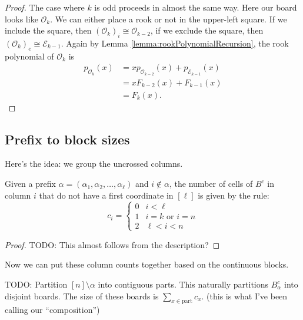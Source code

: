 \begin{proof}
  The case where $k$ is odd proceeds in almost the same way.
  Here our board looks like $\mathcal{O}_{k}$.
  We can either place a rook or not in the upper-left square.
  If we include the square, then $(\mathcal{O}_{k})_i \cong \mathcal{O}_{k-2}$,
  if we exclude the square, then $(\mathcal{O}_{k})_e \cong \mathcal{E}_{k-1}$.
  Again by Lemma \ref{lemma:rookPolynomialRecursion}, the rook polynomial
  of $\mathcal{O}_{k}$ is
  \begin{align}
    p_{\mathcal{O}_{k}}(x)
    &= xp_{\mathcal{O}_{k-2}}(x) + p_{\mathcal{E}_{k-1}}(x) \\
    &= xF_{k-2}(x) + F_{k-1}(x) \\
    &= F_{k}(x).
  \end{align}
\end{proof}

\subsection{Prefix to block sizes}
Here's the idea: we group the uncrossed columns.

\begin{lemma}
  Given a prefix $\alpha = (\alpha_1, \alpha_2, \dots, \alpha_\ell)$
  and $i \not\in \alpha$,
  the number of cells of $B^c$ in column $i$ that do not have
  a first coordinate in $[\ell]$
  is given by the rule:
  \begin{equation}
    c_i = \begin{cases}
      0 & i < \ell \\
      1 & i = k \text{ or } i = n \\
      2 & \ell < i < n
    \end{cases}
  \end{equation}
\end{lemma}

\begin{proof}
  TODO: This almost follows from the description?
\end{proof}

Now we can put these column counts together based on the continuous blocks.

\begin{lemma}
  TODO:
  Partition $[n] \setminus \alpha$ into contiguous parts.
  This naturally partitions $B^c_\alpha$ into disjoint boards.
  The size of these boards is $\sum_{x \in \textrm{part}} c_x$.
  (this is what I've been calling our ``composition'')
\end{lemma}

